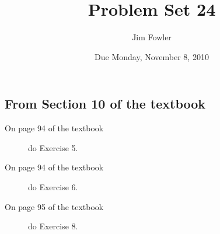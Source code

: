 \documentclass[12pt]{handout}
\author{Jim Fowler}
\title{Problem Set 24}
\date{Due Monday, November  8, 2010}
\begin{document}
\maketitle










\subsection*{From Section 10 of the textbook}



\begin{description}

\item[On page 94 of the textbook] do Exercise 5.

\item[On page 94 of the textbook] do Exercise 6.

\item[On page 95 of the textbook] do Exercise 8.

\end{description}
\end{document}
